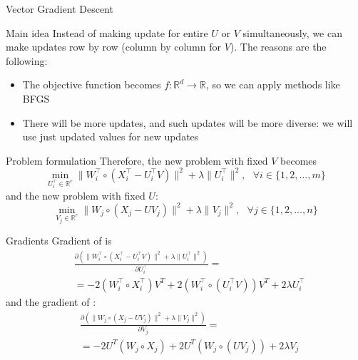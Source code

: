 \documentclass[pdf,10pt]{beamer}
\def\R{\mathbb{R}}
\begin{document}
\begin{section}{Vector Gradient Descent}
 \begin{frame}{Main idea}
   Instead of making update for entire $U$ or $V$ simultaneously, we can make updates row by row (column by column for $V$). The reasons are the following:
   \begin{itemize}
     \item The objective function becomes $f: \R^d \rightarrow \R$, so we can apply methods like BFGS
     \item There will be more updates, and such updates will be more diverse: we will use just updated values for new updates
   \end{itemize}
 \end{frame}
 \begin{frame}{Problem formulation}
   Therefore, the new problem with fixed $V$ becomes
   \begin{equation}\label{eq:vec_u}
     \min_{U^\top_i \in \R^r} \|W^\top_i \circ (X^\top_i - U^\top_i V)\|^2 + \lambda\|U^\top_i\|^2, \text{ }\forall i \in \{1,2,\ldots,m\}
   \end{equation}
   and the new problem with fixed $U$:
   \begin{equation}\label{eq:vec_v}
     \min_{V_j \in \R^r} \|W_j \circ (X_j - UV_j)\|^2  + \lambda\|V_j\|^2, \text{ }\forall j \in \{1,2,\ldots,n\}
   \end{equation}
 \end{frame}
 \begin{frame}{Gradients}
   Gradient of  is
   \begin{equation}\label{eq:vec_grads_u}
     \begin{aligned}
        & \frac{\partial (\|W^\top_i \circ (X^\top_i - U^\top_i V)\|^2 + \lambda\|U^\top_i\|^2)}{\partial U^\top_i} = \\
        & = -2 (W^\top_i \circ X^\top_i) V^T + 2 (W^\top_i \circ (U^\top_i V)) V^T + 2\lambda U^\top_i
     \end{aligned}
   \end{equation}
   and the gradient of :
   \begin{equation}\label{eq:vec_grads_v}
     \begin{aligned}
        & \frac{\partial (\|W_j \circ (X_j - UV_j)\|^2  + \lambda\|V_j\|^2)}{\partial V_j} = \\ & = -2 U^T (W_j \circ X_j) + 2 U^T (W_j \circ (UV_j)) + 2\lambda V_j
     \end{aligned}
   \end{equation}

\end{frame}
\end{section}
\end{document}
